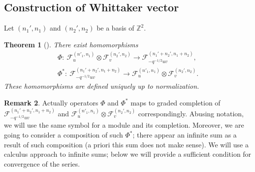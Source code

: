 \documentclass[pdftex]{sigma}
\numberwithin{equation}{section}
\newtheorem{Theorem}{Theorem}[section]
\theoremstyle{definition}
\newtheorem{Remark}[Theorem]{Remark}
\begin{document}
\subsection{Construction of Whittaker vector} \label{section: construction of Whittaker}
Let $(n_1', n_1)$ and $(n_2', n_2)$ be a basis of $\mathbb{Z}^2$.
\begin{Theorem}[\cite{AFS}] \label{Th: AFS} There exist homomorphisms
\begin{gather*}
\Phi\colon \ \mathcal{F}_{u}^{(n'_1,n_1)} \otimes \mathcal{F}_{v}^{(n_2',n_2)} \rightarrow \mathcal{F}_{- q^{-1/2} uv}^{(n_1'+n_2', n_1+n_2)}, \\
\Phi^*\colon \ \mathcal{F}_{- q^{-1/2} uv}^{(n_1'+n_2', n_1+n_2)} \rightarrow \mathcal{F}_{u}^{(n'_1,n_1)} \otimes \mathcal{F}_{v}^{(n_2',n_2)}.
\end{gather*}
These homomorphisms are defined uniquely up to normalization.
\end{Theorem}

\begin{Remark} \label{remark: inf sum}
Actually operators $\Phi$ and $\Phi^*$ maps to graded completion of $\mathcal{F}_{-q^{-1/2} uv}^{(n_1'+n_2', n_1+n_2)}$ and $\mathcal{F}_{u}^{(n'_1,n_1)} \otimes \mathcal{F}_{v}^{(n_2',n_2)}$ correspondingly. Abusing notation, we will use the same symbol for a module and its completion. Moreover, we are going to consider a composition of such $\Phi^*$; there appear an infinite sum as a result of such composition (a priori this sum does not make sense). We will use a calculus approach to infinite sums; below we will provide a sufficient condition for convergence of the series.
\end{Remark}
\end{document}
